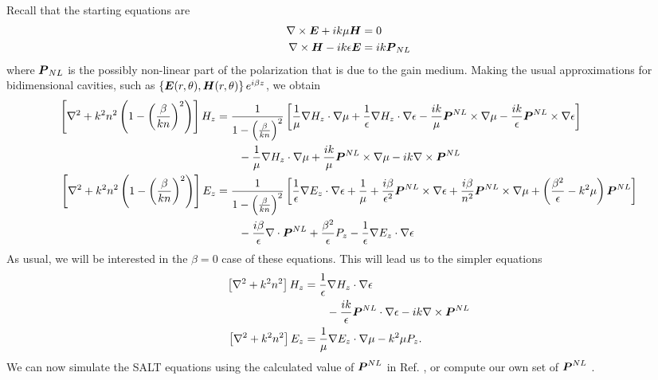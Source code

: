 Recall that the starting equations are 
  \begin{align*}
   \nabla\times\boldsymbol{E}+ik\mu\boldsymbol{H}	&=0	\\
   \nabla\times\boldsymbol{H}-ik\epsilon\boldsymbol{E}	&=ik\boldsymbol{P}_{NL}
  \end{align*}
where $\boldsymbol{P}_{NL}$ is the possibly non-linear part 
of the polarization that is due to the gain medium.
Making the usual approximations for bidimensional cavities, 
such as $\left\{\boldsymbol{E}(r,\theta),\boldsymbol{H}(r,\theta)\right\}e^{i\beta z}$, 
we obtain
  \begin{subequations}
  \begin{align}
   \left[\nabla^2+k^2n^2\left(1-\left(\frac{\beta}{kn}\right)^2\right)\right]H_z	
      &=
	  \frac{1}{1-\left(\frac{\beta}{kn}\right)^2}\left[\frac{1}{\mu}\nabla H_z\cdot\nabla\mu+\frac{1}{\epsilon}\nabla H_z\cdot\nabla\epsilon
							  -\frac{ik}{\mu}\boldsymbol{P}^{NL}\times\nabla\mu-\frac{ik}{\epsilon}\boldsymbol{P}^{NL}\times\nabla\epsilon\right]\nonumber\\
	  &\qquad -\frac{1}{\mu}\nabla H_z\cdot\nabla\mu+\frac{ik}{\mu}\boldsymbol{P}^{NL}\times\nabla\mu-ik\nabla\times\boldsymbol{P}^{NL}\\
  \left[\nabla^2+k^2n^2\left(1-\left(\frac{\beta}{kn}\right)^2\right)\right]E_z
      &= \frac{1}{1-\left(\frac{\beta}{kn}\right)^2}\left[\frac{1}{\epsilon}\nabla E_z\cdot\nabla\epsilon+\frac{1}{\mu}+\frac{i\beta}{\epsilon^2}\boldsymbol{P}^{NL}\times\nabla\epsilon
							  +\frac{i\beta}{n^2}\boldsymbol{P}^{NL}\times\nabla\mu+\left(\frac{\beta^2}{\epsilon}-k^2\mu\right)\boldsymbol{P}^{NL}\right]\nonumber\\
	  &\qquad -\frac{i\beta}{\epsilon}\nabla\cdot\boldsymbol{P}^{NL}+\frac{\beta^2}{\epsilon}P_z-\frac{1}{\epsilon}\nabla E_z\cdot\nabla\epsilon
  \end{align}
  \end{subequations}
As usual, we will be interested in the $\beta=0$ case of these equations.
This will lead us to the simpler equations
  \begin{align}
    \left[\nabla^2+k^2n^2\right]H_z	&= \frac{1}{\epsilon}\nabla H_z\cdot\nabla\epsilon\nonumber\\&\qquad-\frac{ik}{\epsilon}\boldsymbol{P}^{NL}\cdot\nabla\epsilon-ik\nabla\times\boldsymbol{P}^{NL}\\
    \left[\nabla^2+k^2n^2\right]E_z	&= \frac{1}{\mu}\nabla E_z\cdot\nabla\mu-k^2\mu P_z.
  \end{align}
We can now simulate the SALT equations using the calculated value of $\boldsymbol{P}^{NL}$
in Ref. \cite{GE2010a,GE2010b}, or compute our own set of $\boldsymbol{P}^{NL}$ \cite{BOY2003}. 


